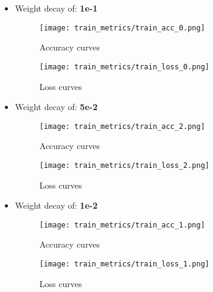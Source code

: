 \documentclass{article}
\begin{document}
\begin{itemize}

    \item Weight decay of: \textbf{1e-1}
    \begin{figure}[H]
    \centering
    \begin{minipage}{.5\linewidth}
        \centering
        \texttt{[image: train\_metrics/train\_acc\_0.png]}
        \vspace{-1.0em}
        \caption{Accuracy curves}

    \end{minipage}%
    \begin{minipage}{.5\textwidth}
      \centering
      \texttt{[image: train\_metrics/train\_loss\_0.png]}
      \vspace{-1.0em}
      \caption{Loss curves}

    \end{minipage}
    \end{figure}
    
    \item Weight decay of: \textbf{5e-2}
    \begin{figure}[H]
    \centering
    \begin{minipage}{.5\linewidth}
        \centering
        \texttt{[image: train\_metrics/train\_acc\_2.png]}
        \vspace{-1.0em}
        \caption{Accuracy curves}

    \end{minipage}%
    \begin{minipage}{.5\textwidth}
      \centering
      \texttt{[image: train\_metrics/train\_loss\_2.png]}
      \vspace{-1.0em}
      \caption{Loss curves}

    \end{minipage}
    \end{figure}
    
    \item Weight decay of: \textbf{1e-2}
    \begin{figure}[H]
    \centering
    \begin{minipage}{.5\linewidth}
        \centering
        \texttt{[image: train\_metrics/train\_acc\_1.png]}
        \vspace{-1.0em}
        \caption{Accuracy curves}

    \end{minipage}%
    \begin{minipage}{.5\textwidth}
      \centering
      \texttt{[image: train\_metrics/train\_loss\_1.png]}
      \vspace{-1.0em}
      \caption{Loss curves}


\end{minipage}
\end{figure}
\end{itemize}
\end{document}
